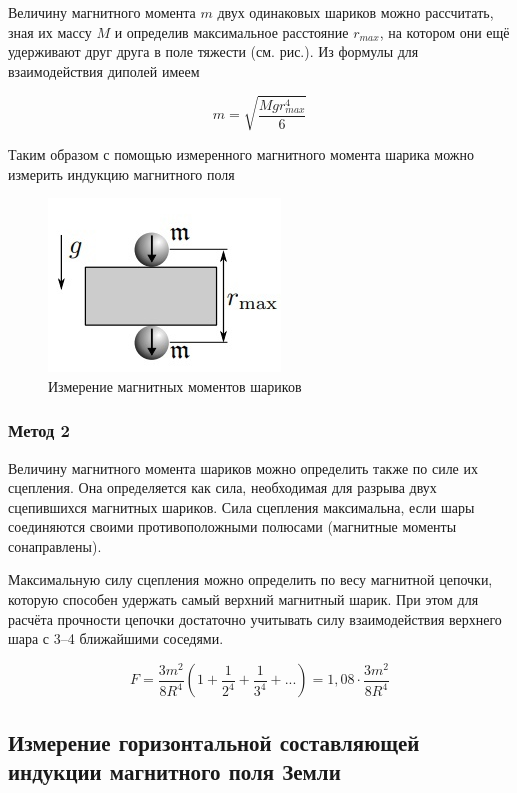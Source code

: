 \documentclass[a4paper, 12pt]{article}%
\begin{document}
Величину магнитного момента $m$ двух одинаковых шариков можно рассчитать, зная их массу $M$ и определив максимальное расстояние $r_{max}$, на котором они ещё удерживают друг друга в поле тяжести (см. рис.). Из формулы для взаимодействия диполей имеем

\begin{equation}
    m = \sqrt{\frac{Mgr^4_{max}}{6}}
\end{equation}

Таким образом с помощью измеренного магнитного момента шарика можно измерить индукцию магнитного поля

\begin{figure}[h]
    \centering
    \includegraphics[width = 5 cm]{1.jpg}
    \caption{Измерение магнитных моментов шариков}
    \label{msh1}
\end{figure}

\subsubsection{Метод 2}

Величину магнитного момента шариков можно определить также по силе их сцепления. Она определяется как сила, необходимая для разрыва двух сцепившихся магнитных шариков. Сила сцепления максимальна, если шары соединяются своими противоположными полюсами (магнитные моменты сонаправлены).

Максимальную силу сцепления можно определить по весу магнитной цепочки, которую способен удержать самый верхний магнитный шарик. При этом для расчёта прочности цепочки достаточно учитывать силу взаимодействия верхнего шара с 3–4 ближайшими соседями.

\begin{equation}
    F = \frac{3m^2}{8R^4} \left( 1 + \frac{1}{2^4} + \frac{1}{3^4} + ...\right) = 1,08 \cdot \frac{3m^2}{8R^4}
\end{equation}

\subsection{Измерение горизонтальной составляющей индукции магнитного поля Земли}
\end{document}
